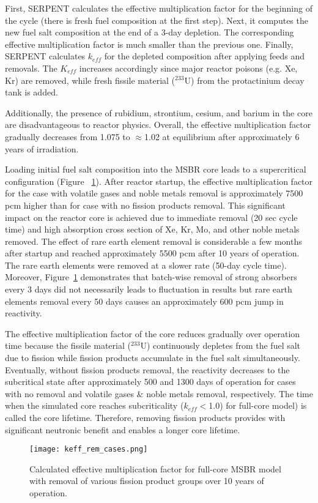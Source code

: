 First, SERPENT calculates the effective multiplication factor for the beginning 
of the cycle (there is fresh fuel composition at the first step). Next, it 
computes the new fuel salt composition at the end of a 3-day depletion. The 
corresponding effective multiplication factor is much smaller than the previous 
one. Finally, SERPENT calculates $k_{eff}$ for the depleted composition after 
applying feeds and removals. The $K_{eff}$ increases accordingly since major reactor 
poisons (e.g. Xe, Kr) are removed, while fresh fissile material ($^{233}$U) 
from the protactinium decay tank is added.  

Additionally, the presence of rubidium, strontium, cesium, and barium in the 
core are disadvantageous to reactor physics. 
Overall, the effective multiplication factor gradually decreases from 1.075 to 
$\approx$1.02 at equilibrium after approximately 6 years of irradiation. 

Loading initial fuel salt composition into the \gls{MSBR} core leads to a 
supercritical configuration (Figure ~\ref{fig:fp_removal}). After reactor 
startup, the effective multiplication factor for the case with volatile gases 
and noble metals removal is approximately 7500 pcm  higher than for case with 
no fission products removal. This significant impact on the reactor core is
achieved due to immediate removal (20 sec cycle time) and high absorption cross 
section of Xe, Kr, Mo, and other noble metals removed. The effect of rare earth 
element removal is considerable a few months after startup and reached 
approximately 5500 pcm after 10 years of operation. The rare earth elements were 
removed at a slower rate (50-day cycle time). Moreover, 
Figure~\ref{fig:fp_removal} demonstrates that batch-wise removal of strong 
absorbers every 3 days did not necessarily leads to fluctuation in results 
but rare earth elements removal every 50 days causes an approximately 600 pcm jump 
in reactivity.

The effective multiplication factor of the core reduces gradually over 
operation time because the fissile material ($^{233}$U) continuously depletes 
from the fuel salt due to fission while fission products 
accumulate in the fuel salt simultaneously. Eventually, without fission products removal, 
the reactivity decreases to the subcritical state after approximately 500 and 
1300 days of operation for cases with no removal and volatile gases \& noble 
metals removal, respectively. The time when the simulated core reaches 
subcriticality ($k_{eff}<$1.0) for full-core model) is called the core lifetime. 
Therefore, removing fission products provides with significant neutronic benefit 
and enables a longer core lifetime.
\begin{figure}[ht!] %
  \centering
  \texttt{[image: keff\_rem\_cases.png]} 
  \caption{Calculated effective multiplication factor for full-core \gls{MSBR} 
model with removal of various fission product groups over 10 years of 
operation.}
  \label{fig:fp_removal}
\end{figure}

